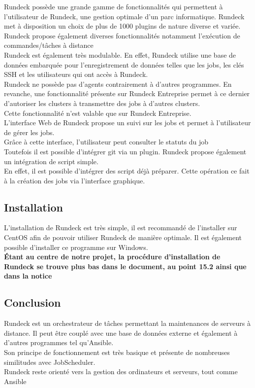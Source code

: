 \documentclass[12pt]{article}
\begin{document}
Rundeck possède une grande gamme de fonctionnalités qui permettent à l'utilisateur de Rundeck, une gestion optimale d'un parc informatique. Rundeck met à disposition un choix de plus de 1000 plugins de nature diverse et variée. 
\\
Rundeck propose également diverses fonctionnalités notamment l'exécution de commandes/tâches à distance
\\
Rundeck est également très modulable. En effet, Rundeck utilise une base de données embarquée pour l'enregistrement de données telles que les jobs, les clés SSH et les utilisateurs qui ont accès à Rundeck.
\\
Rundeck ne possède pas d'agents contrairement à d'autres programmes. En revanche, une fonctionnalité présente sur Rundeck Entreprise permet à ce dernier d'autoriser les clusters à transmettre des jobs à d'autres clusters.
\\
Cette fonctionnalité n'est valable que sur Rundeck Entreprise.
\\
L'interface Web de Rundeck propose un suivi sur les jobs et permet à l'utilisateur de gérer les jobs.
\\
Grâce à cette interface, l'utilisateur peut consulter le statuts du job
\\
Toutefois il est possible d'intégrer git via un plugin. Rundeck propose également un intégration de script simple.
\\
En effet, il est possible d'intégrer des script déjà préparer. Cette opération ce fait à la création des jobs via l'interface graphique.

\subsection{Installation}
L'installation de Rundeck est très simple, il est recommandé de l'installer sur CentOS afin de pouvoir utiliser Rundeck de manière optimale. Il est également possible d'installer ce programme sur Windows. 
\\
\textbf{Étant au centre de notre projet, la procédure d'installation de Rundeck se trouve plus bas dans le document, au point 15.2 ainsi que dans la notice}

\subsection{Conclusion}
Rundeck est un orchestrateur de tâches permettant la maintenances de serveurs à distance. Il peut être couplé avec une base de données externe et également à d'autres programmes tel qu'Ansible.
\\
Son principe de fonctionnement est très basique et présente de nombreuses similitudes avec JobScheduler.
\\
Rundeck reste orienté vers la gestion des ordinateurs et serveurs, tout comme Ansible
\end{document}
